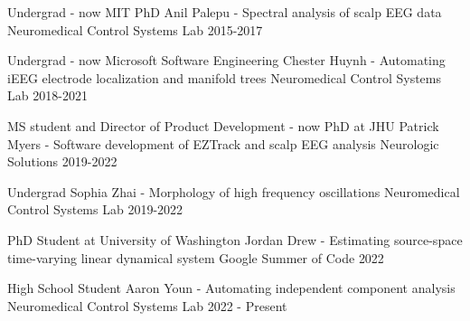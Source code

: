 \begin{cventries}
\cventry
    {Undergrad - now MIT PhD} %
    {Anil Palepu - Spectral analysis of scalp EEG data} %
    {Neuromedical Control Systems Lab} %
    {2015-2017} %
    {\empty}
    \vspace{-\baselineskip}
    
\cventry
    {Undergrad - now Microsoft Software Engineering} %
    {Chester Huynh - Automating iEEG electrode localization and manifold trees} %
    {Neuromedical Control Systems Lab} %
    {2018-2021} %
    {\empty}
    \vspace{-\baselineskip}
    
\cventry
    {MS student and Director of Product Development - now PhD at JHU} %
    {Patrick Myers - Software development of EZTrack and scalp EEG analysis} %
    {Neurologic Solutions} %
    {2019-2022} %
    {\empty}
    \vspace{-\baselineskip}
    
\cventry
    {Undergrad} %
    {Sophia Zhai - Morphology of high frequency oscillations} %
    {Neuromedical Control Systems Lab} %
    {2019-2022} %
    {\empty}
    \vspace{-\baselineskip}
    
\cventry
    {PhD Student at University of Washington} %
    {Jordan Drew - Estimating source-space time-varying linear dynamical system} %
    {Google Summer of Code} %
    {2022} %
    {\empty}
    \vspace{-\baselineskip}
    
\cventry
    {High School Student} %
    {Aaron Youn - Automating independent component analysis} %
    {Neuromedical Control Systems Lab} %
    {2022 - Present} %
    {\empty}
    \vspace{-\baselineskip}
    

\end{cventries}

